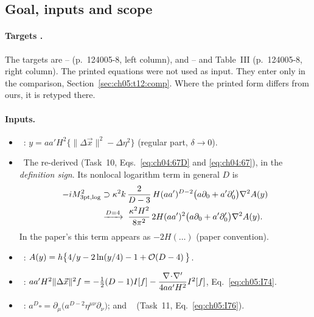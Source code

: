 \subsection{Goal, inputs and scope}

\paragraph{Targets \tP.}
The targets are -- (p.~124005-8, left column), and -- and Table~III (p.~124005-8, right column).
The printed equations were not used as input. They enter only in the comparison, Section~\ref{sec:ch05:t12:comp}.
Where the printed form differs from ours, it is retyped there.

\paragraph{Inputs.}
\begin{itemize}[leftmargin=14pt]
\item[(G1)] \tP\ : $y=aa'H^2\{\|\Delta\vec x\|^2-\Delta\eta^2\}$ (regular part, $\delta\to0$).
\item[(G2)] \tD\ The re-derived  (Task~10, Eqs.~\eqref{eq:ch04:67D} and \eqref{eq:ch04:67}), in the \emph{definition sign}. Its nonlocal logarithm term in general $D$ is
\begin{equation}
\begin{aligned}
-iM^2_{\rm 3pt,log}&\supset\kappa^2k\,\frac{2}{D-3}\,H(aa')^{D-2}\big(a\partial_0+a'\partial'_0\big)\nabla^2A(y)\\
&\xrightarrow{D=4}\;\frac{\kappa^2H^2}{8\pi^2}\,2H(aa')^2\big(a\partial_0+a'\partial'_0\big)\nabla^2A(y).
\end{aligned}
\label{eq:ch05:t12:G2}
\end{equation}
In the paper's  this term appears as $-2H(\ldots)$ (paper convention).
\item[(G3)] \tD\ : $A(y)=h\big\{4/y-2\ln(y/4)-1+\mathcal{O}\!\left(D-4\right)\big\}$.
\item[(G4)] \tD\ : $aa'H^2\|\Delta\vec x\|^2f=-\tfrac12(D-1)I[f]-\dfrac{\nabla\!\cdot\!\nabla'}{4aa'H^2}I^2[f]$, Eq.~\eqref{eq:ch05:I74}.
\item[(G5)] \tP\ : $a^D\square=\partial_\mu\big(a^{D-2}\eta^{\mu\nu}\partial_\nu\big)$; and \tD\  (Task~11, Eq.~\eqref{eq:ch05:I76}).
\end{itemize}

